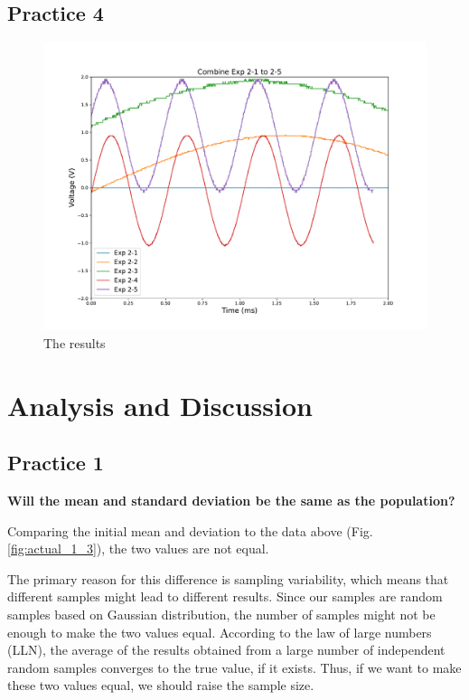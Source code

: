 \documentclass[12pt,a4paper]{article}
\begin{document}
\begin{CJK}{UTF8}{bkai}
\clearpage
\subsection{Practice 4}

\begin{figure}[h]
    \centering
    \includegraphics[width=0.9\linewidth]{figures/combine.pdf}
    \caption{The results}
    \label{fig:practice_4_result}
\end{figure}



\clearpage
\section{Analysis and Discussion}\label{sec:discussion}

\subsection{Practice 1}
\hfill

\begin{center}
    \bf Will the mean and standard deviation be the same as the population?
\end{center}

Comparing the initial mean and deviation to the data above (Fig.\ref{fig:actual_1_3}), the two values are not equal.
    
The primary reason for this difference is sampling variability, which means that different samples might lead to different results. Since our samples are random samples based on Gaussian distribution, the number of samples might not be enough to make the two values equal. According to the law of large numbers (LLN), the average of the results obtained from a large number of independent random samples converges to the true value, if it exists. Thus, if we want to make these two values equal, we should raise the sample size.



\end{CJK}
\end{document}
